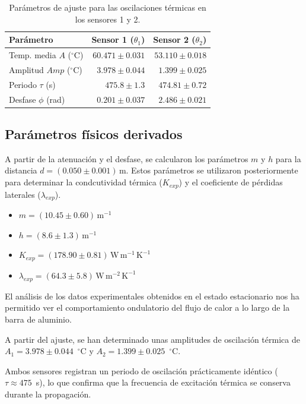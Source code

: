\documentclass[a4paper,11pt]{article}
\begin{document}
\begin{table}[H]
    \centering
    \caption{Parámetros de ajuste para las oscilaciones térmicas en los sensores 1 y 2.}
    \label{tab:fit_results}
    \begin{tabular}{lrr}
        \toprule
        Parámetro & {Sensor 1 ($\theta_1$)} & {Sensor 2 ($\theta_2$)} \\
        \midrule
        Temp. media $A$ ($^\circ$C) & $60.471 \pm 0.031$ & $53.110 \pm 0.018$ \\
        Amplitud $Amp$ ($^\circ$C) & $3.978 \pm 0.044$ & $1.399 \pm 0.025$ \\
        Periodo $\tau$ (s) & $475.8 \pm 1.3$ & $474.81 \pm 0.72$ \\
        Desfase $\phi$ (rad) & $0.201 \pm 0.037$ & $2.486 \pm 0.021$ \\
        \bottomrule
    \end{tabular}
\end{table}

\subsection{Parámetros físicos derivados}
A partir de la atenuación y el desfase, se calcularon los parámetros $m$ y $h$ para la distancia $d = (0.050 \pm 0.001)\,\mathrm{m}$. Estos parámetros se utilizaron posteriormente para determinar la condcutividad térmica ($K_{exp}$) y el coeficiente de pérdidas laterales ($\lambda_{exp}$).

\begin{itemize}
    \item $m = (10.45 \pm 0.60)\,\mathrm{m^{-1}}$
    \item $h = (8.6 \pm 1.3)\,\mathrm{m^{-1}}$
    \item $K_{exp} = (178.90 \pm 0.81)\,\mathrm{W\,m^{-1}\,K^{-1}}$
    \item $\lambda_{exp} = (64.3 \pm 5.8)\,\mathrm{W\,m^{-2}\,K^{-1}}$
\end{itemize}
El análisis de los datos experimentales obtenidos en el estado estacionario nos ha permitido ver el comportamiento ondulatorio del flujo de calor a lo largo de la barra de aluminio. 

A partir del ajuste, se han determinado unas amplitudes de oscilación térmica de $A_1 = 3.978 \pm 0.044$~$^\circ$C y $A_2 = 1.399 \pm 0.025$~$^\circ$C. 

Ambos sensores registran un periodo de oscilación prácticamente idéntico ($\tau \approx 475$~s), lo que confirma que la frecuencia de excitación térmica se conserva durante la propagación.
\end{document}
